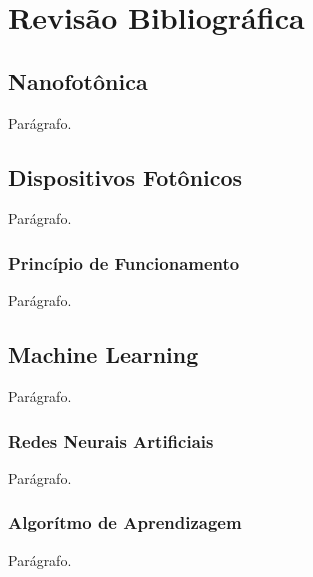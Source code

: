 \chapter{Revisão Bibliográfica}



\section{Nanofotônica}

Parágrafo.

\section{Dispositivos Fotônicos}

Parágrafo.

\subsection{Princípio de Funcionamento}

Parágrafo.

\section{Machine Learning}

Parágrafo.

\subsection{Redes Neurais Artificiais}

Parágrafo.


\subsection{Algorítmo de Aprendizagem}

Parágrafo.